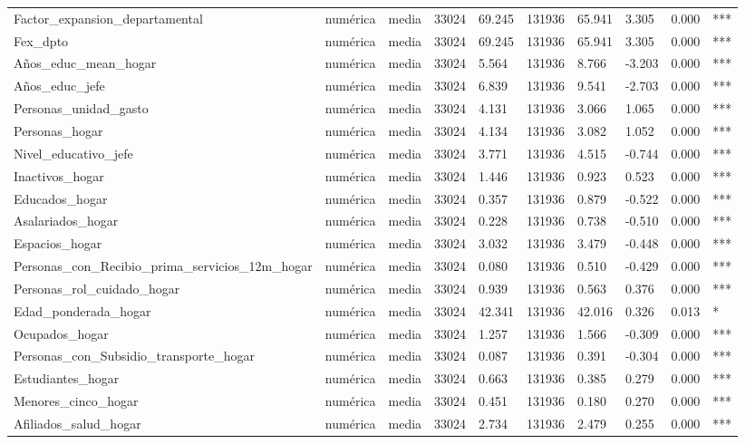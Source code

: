 \begin{longtable}[t]{llllllllll}
Factor\_expansion\_departamental & numérica & media & 33024 & 69.245 & 131936 & 65.941 & 3.305 & 0.000 & ***\\
Fex\_dpto & numérica & media & 33024 & 69.245 & 131936 & 65.941 & 3.305 & 0.000 & ***\\
Años\_educ\_mean\_hogar & numérica & media & 33024 & 5.564 & 131936 & 8.766 & -3.203 & 0.000 & ***\\
Años\_educ\_jefe & numérica & media & 33024 & 6.839 & 131936 & 9.541 & -2.703 & 0.000 & ***\\
Personas\_unidad\_gasto & numérica & media & 33024 & 4.131 & 131936 & 3.066 & 1.065 & 0.000 & ***\\
Personas\_hogar & numérica & media & 33024 & 4.134 & 131936 & 3.082 & 1.052 & 0.000 & ***\\
Nivel\_educativo\_jefe & numérica & media & 33024 & 3.771 & 131936 & 4.515 & -0.744 & 0.000 & ***\\
Inactivos\_hogar & numérica & media & 33024 & 1.446 & 131936 & 0.923 & 0.523 & 0.000 & ***\\
Educados\_hogar & numérica & media & 33024 & 0.357 & 131936 & 0.879 & -0.522 & 0.000 & ***\\
Asalariados\_hogar & numérica & media & 33024 & 0.228 & 131936 & 0.738 & -0.510 & 0.000 & ***\\
Espacios\_hogar & numérica & media & 33024 & 3.032 & 131936 & 3.479 & -0.448 & 0.000 & ***\\
Personas\_con\_Recibio\_prima\_servicios\_12m\_hogar & numérica & media & 33024 & 0.080 & 131936 & 0.510 & -0.429 & 0.000 & ***\\
Personas\_rol\_cuidado\_hogar & numérica & media & 33024 & 0.939 & 131936 & 0.563 & 0.376 & 0.000 & ***\\
Edad\_ponderada\_hogar & numérica & media & 33024 & 42.341 & 131936 & 42.016 & 0.326 & 0.013 & *\\
Ocupados\_hogar & numérica & media & 33024 & 1.257 & 131936 & 1.566 & -0.309 & 0.000 & ***\\
Personas\_con\_Subsidio\_transporte\_hogar & numérica & media & 33024 & 0.087 & 131936 & 0.391 & -0.304 & 0.000 & ***\\
Estudiantes\_hogar & numérica & media & 33024 & 0.663 & 131936 & 0.385 & 0.279 & 0.000 & ***\\
Menores\_cinco\_hogar & numérica & media & 33024 & 0.451 & 131936 & 0.180 & 0.270 & 0.000 & ***\\
Afiliados\_salud\_hogar & numérica & media & 33024 & 2.734 & 131936 & 2.479 & 0.255 & 0.000 & ***\\

\end{longtable}
